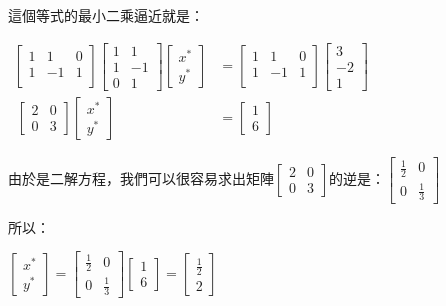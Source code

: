 \documentclass[11pt]{article}
\begin{document}
{    這個等式的最小二乘逼近就是：

\(\begin{align} \begin{bmatrix} 1 & 1 & 0 \\ 1 & -1 & 1\\ \end{bmatrix} \begin{bmatrix} 1 & 1 \\ 1 & -1 \\ 0 & 1 \end{bmatrix} \begin{bmatrix} x^* \\ y^* \end{bmatrix} & = \begin{bmatrix} 1 & 1 & 0 \\ 1 & -1 & 1\\ \end{bmatrix} \begin{bmatrix} 3 \\ -2 \\ 1 \end{bmatrix} \\\
\begin{bmatrix} 2 & 0 \\ 0 & 3 \end{bmatrix} \begin{bmatrix} x^* \\ y^* \end{bmatrix} & = \begin{bmatrix} 1 \\ 6 \end{bmatrix} \end{align}\)

由於是二解方程，我們可以很容易求出矩陣\(\begin{bmatrix}2 & 0 \\ 0 & 3\end{bmatrix}\)的逆是：\(\begin{bmatrix}\frac{1}{2} & 0 \\ 0 & \frac{1}{3}\end{bmatrix}\)

所以：

\(\begin{bmatrix} x^* \\ y^* \end{bmatrix} = \begin{bmatrix}\frac{1}{2} & 0 \\ 0 & \frac{1}{3}\end{bmatrix} \begin{bmatrix} 1 \\ 6 \end{bmatrix} = \begin{bmatrix} \frac{1}{2} \\ 2 \end{bmatrix}\)

}
\end{document}
